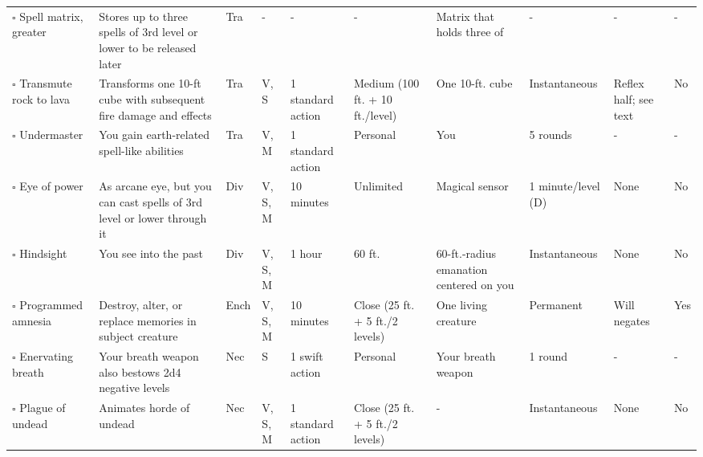 \documentclass[12pt, a4paper]{article}
\begin{document}
\begin{center}
\begin{longtable}[H]{ p{8em} p{15em} p{2em} p{5em} p{6em} p{6em} p{10em} p{6em} p{5em} p{2em} }
    \(\square\) Spell matrix, greater & Stores up to three spells of 3rd level or lower to be released later & Tra & - & - & - & Matrix that holds three of  & - & - & -\\
    \(\square\) Transmute rock to lava & Transforms one 10-ft cube with subsequent fire damage and effects & Tra & V, S & 1 standard action & Medium (100 ft. + 10 ft./level) & One 10-ft. cube & Instantaneous & Reﬂex half; see text & No\\
    \(\square\) Undermaster & You gain earth-related spell-like abilities & Tra & V, M & 1 standard action & Personal & You & 5 rounds & - & -\\
    \(\square\) Eye of power & As arcane eye, but you can cast spells of 3rd level or lower through it & Div & V, S, M & 10 minutes & Unlimited & Magical sensor & 1 minute/level (D) & None & No\\
    \(\square\) Hindsight & You see into the past & Div & V, S, M & 1 hour & 60 ft. & 60-ft.-radius emanation centered on you & Instantaneous & None & No\\
    \(\square\) Programmed amnesia & Destroy, alter, or replace memories in subject creature & Ench & V, S, M & 10 minutes & Close (25 ft. + 5 ft./2 levels) & One living creature & Permanent & Will negates & Yes\\
    \(\square\) Enervating breath & Your breath weapon also bestows 2d4 negative levels & Nec & S & 1 swift action & Personal & Your breath weapon & 1 round & - & -\\
    \(\square\) Plague of undead & Animates horde of undead & Nec & V, S, M & 1 standard action & Close (25 ft. + 5 ft./2 levels) & - & Instantaneous & None & No\\
  \end{longtable}
\end{center}
\end{document}
